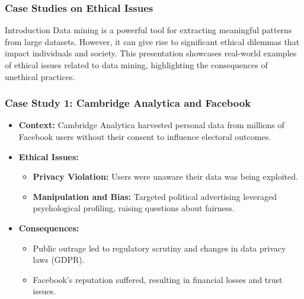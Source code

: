 \documentclass[aspectratio=169]{beamer}
\begin{document}
\begin{frame}[fragile]
  \frametitle{Case Studies on Ethical Issues}
  \begin{block}{Introduction}
    Data mining is a powerful tool for extracting meaningful patterns from large datasets. However, it can give rise to significant ethical dilemmas that impact individuals and society. This presentation showcases real-world examples of ethical issues related to data mining, highlighting the consequences of unethical practices.
  \end{block}
\end{frame}

\begin{frame}[fragile]
  \frametitle{Case Study 1: Cambridge Analytica and Facebook}
  \begin{itemize}
    \item \textbf{Context:} Cambridge Analytica harvested personal data from millions of Facebook users without their consent to influence electoral outcomes.
    \item \textbf{Ethical Issues:}
      \begin{itemize}
        \item \textbf{Privacy Violation:} Users were unaware their data was being exploited.
        \item \textbf{Manipulation and Bias:} Targeted political advertising leveraged psychological profiling, raising questions about fairness.
      \end{itemize}
    \item \textbf{Consequences:}
      \begin{itemize}
        \item Public outrage led to regulatory scrutiny and changes in data privacy laws (GDPR).
        \item Facebook’s reputation suffered, resulting in financial losses and trust issues.
      \end{itemize}
  \end{itemize}
\end{frame}
\end{document}
